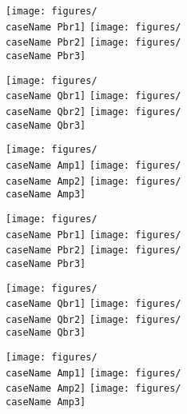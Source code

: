 \documentclass[12pt]{article}
\begin{document}
\newcommand{\caseName}{SixMachineRamp1}
\begin{landscape}

\texttt{[image: figures/\\caseName Pbr1]}%
\texttt{[image: figures/\\caseName Pbr2]}%
\texttt{[image: figures/\\caseName Pbr3]}

\texttt{[image: figures/\\caseName Qbr1]}%
\texttt{[image: figures/\\caseName Qbr2]}%
\texttt{[image: figures/\\caseName Qbr3]}

\texttt{[image: figures/\\caseName Amp1]}%
\texttt{[image: figures/\\caseName Amp2]}%
\texttt{[image: figures/\\caseName Amp3]}

\end{landscape}
\pagebreak
\renewcommand{\caseName}{SixMachineRamp1rev}
\begin{landscape}

\texttt{[image: figures/\\caseName Pbr1]}%
\texttt{[image: figures/\\caseName Pbr2]}%
\texttt{[image: figures/\\caseName Pbr3]}

\texttt{[image: figures/\\caseName Qbr1]}%
\texttt{[image: figures/\\caseName Qbr2]}%
\texttt{[image: figures/\\caseName Qbr3]}

\texttt{[image: figures/\\caseName Amp1]}%
\texttt{[image: figures/\\caseName Amp2]}%
\texttt{[image: figures/\\caseName Amp3]}

\end{landscape}


		
\end{document}
